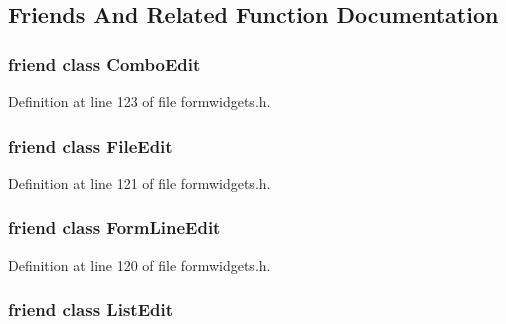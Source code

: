 \subsection{Friends And Related Function Documentation}
\hypertarget{classFormWidgetsController_a3134ca198f844b980fe13f5b50030e41}{
\subsubsection[{Combo\+Edit}]{\setlength{\rightskip}{0pt plus 5cm}friend class {\bf Combo\+Edit}\hspace{0.3cm}{\ttfamily [friend]}}}\label{classFormWidgetsController_a3134ca198f844b980fe13f5b50030e41}


Definition at line 123 of file formwidgets.\+h.

\hypertarget{classFormWidgetsController_a7384fce473ce2904e4ab8cd0ea203a4d}{
\subsubsection[{File\+Edit}]{\setlength{\rightskip}{0pt plus 5cm}friend class {\bf File\+Edit}\hspace{0.3cm}{\ttfamily [friend]}}}\label{classFormWidgetsController_a7384fce473ce2904e4ab8cd0ea203a4d}


Definition at line 121 of file formwidgets.\+h.

\hypertarget{classFormWidgetsController_aa967b95243181e5bf4be56d15aa308a8}{
\subsubsection[{Form\+Line\+Edit}]{\setlength{\rightskip}{0pt plus 5cm}friend class {\bf Form\+Line\+Edit}\hspace{0.3cm}{\ttfamily [friend]}}}\label{classFormWidgetsController_aa967b95243181e5bf4be56d15aa308a8}


Definition at line 120 of file formwidgets.\+h.

\hypertarget{classFormWidgetsController_a3858cd94d64529f72cdf487814e2932c}{
\subsubsection[{List\+Edit}]{\setlength{\rightskip}{0pt plus 5cm}friend class {\bf List\+Edit}\hspace{0.3cm}{\ttfamily [friend]}}}\label{classFormWidgetsController_a3858cd94d64529f72cdf487814e2932c}


